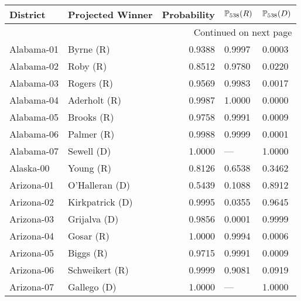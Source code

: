 \begin{longtable}{llrll}
\toprule
          District &                    Projected Winner &  Probability & $\P_{538}(R)$ & $\P_{538}(D)$ \\
\midrule
\endhead
\midrule
\multicolumn{5}{r}{{Continued on next page}} \\
\midrule
\endfoot

\bottomrule
\endlastfoot
        Alabama-01 &             {\color{Red} Byrne (R)} &       0.9388 &        0.9997 &        0.0003 \\
        Alabama-02 &              {\color{Red} Roby (R)} &       0.8512 &        0.9780 &        0.0220 \\
        Alabama-03 &            {\color{Red} Rogers (R)} &       0.9569 &        0.9983 &        0.0017 \\
        Alabama-04 &          {\color{Red} Aderholt (R)} &       0.9987 &        1.0000 &        0.0000 \\
        Alabama-05 &            {\color{Red} Brooks (R)} &       0.9758 &        0.9991 &        0.0009 \\
        Alabama-06 &            {\color{Red} Palmer (R)} &       0.9988 &        0.9999 &        0.0001 \\
        Alabama-07 &           {\color{Blue} Sewell (D)} &       1.0000 &           --- &        1.0000 \\
         Alaska-00 &             {\color{Red} Young (R)} &       0.8126 &        0.6538 &        0.3462 \\
        Arizona-01 &       {\color{Blue} O'Halleran (D)} &       0.5439 &        0.1088 &        0.8912 \\
        Arizona-02 &      {\color{Blue} Kirkpatrick (D)} &       0.9995 &        0.0355 &        0.9645 \\
        Arizona-03 &         {\color{Blue} Grijalva (D)} &       0.9856 &        0.0001 &        0.9999 \\
        Arizona-04 &             {\color{Red} Gosar (R)} &       1.0000 &        0.9994 &        0.0006 \\
        Arizona-05 &             {\color{Red} Biggs (R)} &       0.9715 &        0.9991 &        0.0009 \\
        Arizona-06 &        {\color{Red} Schweikert (R)} &       0.9999 &        0.9081 &        0.0919 \\
        Arizona-07 &          {\color{Blue} Gallego (D)} &       1.0000 &           --- &        1.0000 \\

\end{longtable}
